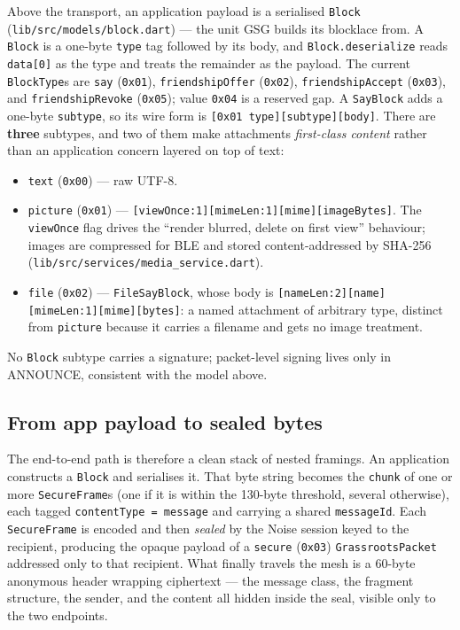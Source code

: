 \documentclass[11pt]{report}
\newcommand{\code}[1]{\texttt{\small #1}}
\begin{document}
Above the transport, an application payload is a serialised \code{Block} (\code{lib/src/models/block.dart}) — the unit GSG builds its blocklace from. A \code{Block} is a one-byte \code{type} tag followed by its body, and \code{Block.deserialize} reads \code{data[0]} as the type and treats the remainder as the payload. The current \code{BlockType}s are \code{say} (\code{0x01}), \code{friendshipOffer} (\code{0x02}), \code{friendshipAccept} (\code{0x03}), and \code{friendshipRevoke} (\code{0x05}); value \code{0x04} is a reserved gap. A \code{SayBlock} adds a one-byte \code{subtype}, so its wire form is \code{[0x01 type][subtype][body]}. There are \textbf{three} subtypes, and two of them make attachments \emph{first-class content} rather than an application concern layered on top of text:

\begin{itemize}
  \item \code{text} (\code{0x00}) --- raw UTF-8.
  \item \code{picture} (\code{0x01}) --- \code{[viewOnce:1][mimeLen:1][mime][imageBytes]}. The \code{viewOnce} flag drives the ``render blurred, delete on first view'' behaviour; images are compressed for BLE and stored content-addressed by SHA-256 (\code{lib/src/services/media_service.dart}).
  \item \code{file} (\code{0x02}) --- \code{FileSayBlock}, whose body is \code{[nameLen:2][name][mimeLen:1][mime][bytes]}: a named attachment of arbitrary type, distinct from \code{picture} because it carries a filename and gets no image treatment.
\end{itemize}

No \code{Block} subtype carries a signature; packet-level signing lives only in ANNOUNCE, consistent with the model above.

\subsection*{From app payload to sealed bytes}

The end-to-end path is therefore a clean stack of nested framings. An application constructs a \code{Block} and serialises it. That byte string becomes the \code{chunk} of one or more \code{SecureFrame}s (one if it is within the 130-byte threshold, several otherwise), each tagged \code{contentType = message} and carrying a shared \code{messageId}. Each \code{SecureFrame} is encoded and then \emph{sealed} by the Noise session keyed to the recipient, producing the opaque payload of a \code{secure} (\code{0x03}) \code{GrassrootsPacket} addressed only to that recipient. What finally travels the mesh is a 60-byte anonymous header wrapping ciphertext — the message class, the fragment structure, the sender, and the content all hidden inside the seal, visible only to the two endpoints.
\end{document}
